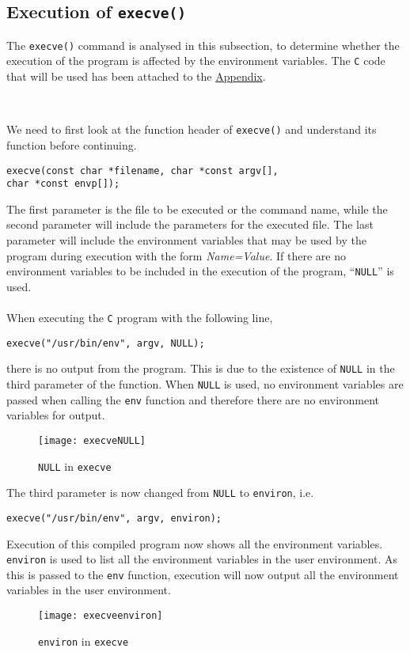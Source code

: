 \documentclass[a4paper,12pt]{article}
\begin{document}
\subsection{Execution of \texttt{execve()}}
{\par \noindent The \texttt{execve()} command is analysed in this subsection, to determine whether the execution of the program is affected by the environment variables. The \texttt{C} code that will be used has been attached to the \hyperref[Appsec:3.3]{Appendix}.}\\
{\par \noindent We need to first look at the function header of \texttt{execve()} and understand its function before continuing.}
\begin{verbatim}
execve(const char *filename, char *const argv[], 
char *const envp[]);
\end{verbatim}
The first parameter is the file to be executed or the command name, while the second parameter will include the parameters for the executed file. The last parameter will include the environment variables that may be used by the program during execution with the form \textit{Name=Value}. If there are no environment variables to be included in the execution of the program, ``\texttt{NULL}'' is used.\\\\
When executing the \texttt{C} program with the following line,
\begin{verbatim}
execve("/usr/bin/env", argv, NULL);
\end{verbatim}
there is no output from the program. This is due to the existence of \texttt{NULL} in the third parameter of the function. When \texttt{NULL} is used, no environment variables are passed when calling the \texttt{env} function and therefore there are no environment variables for output.\\
\begin{figure}[H]
	\centering
	\texttt{[image: execveNULL]}
	\caption{\texttt{NULL} in \texttt{execve}}
	\label{fig:execvenull}
\end{figure}
{\par \noindent The third parameter is now changed from \texttt{NULL} to \texttt{environ}, i.e. 
	\begin{verbatim}execve("/usr/bin/env", argv, environ);\end{verbatim} 
	Execution of this compiled program now shows all the environment variables. \texttt{environ} is used to list all the environment variables in the user environment. As this is passed to the \texttt{env} function, execution will now output all the environment variables in the user environment.}
\begin{figure}[H]
	\centering
	\texttt{[image: execveenviron]}
	\caption{\texttt{environ} in \texttt{execve}}
	\label{fig:execveenviron}
\end{figure}
\end{document}

